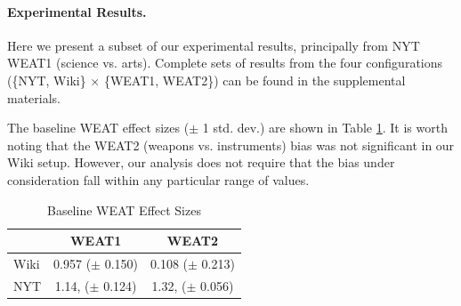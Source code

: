 \documentclass{article}
\newcommand{\xhdr}[1]{\paragraph*{\bf {#1.}}}
\begin{document}

\xhdr{Experimental Results}\label{results}
Here we present a subset of our experimental results, principally from NYT WEAT1 (science vs. arts). 
Complete sets of results from the four configurations (\{NYT, Wiki\} $\times$ \{WEAT1, WEAT2\}) can be found in the supplemental materials. 

The baseline WEAT effect sizes ($\pm$ 1 std. dev.) are shown in Table \ref{tab:baseline}. It is worth noting that the WEAT2 (weapons vs. instruments) bias was not significant in our Wiki setup.
However, our analysis does not require that the bias under consideration fall within any particular range of values.

\begin{table}
    \caption{Baseline WEAT Effect Sizes}
    \smallskip
    \label{tab:baseline}
    \centering
    \begin{tabular}{ l  c  c }
    \hline
         & WEAT1                 & WEAT2 \\ \hline
    Wiki & 0.957 ($\pm$ 0.150) & 0.108 ($\pm$ 0.213)\\
    NYT  & 1.14, ($\pm$ 0.124) & 1.32, ($\pm$ 0.056)\\
    \end{tabular}
\end{table}
\end{document}
